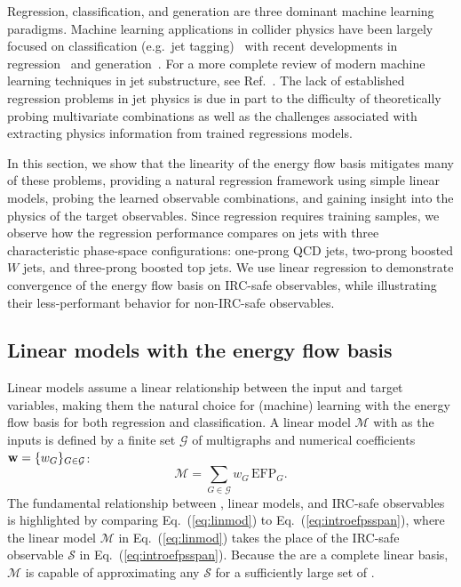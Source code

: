 \documentclass[letterpaper,11pt]{article}
\DeclareRobustCommand{\Eq}[1]{Eq.~(\ref{#1})}
\DeclareRobustCommand{\Ref}[1]{Ref.~\cite{#1}}
\newcommand{\B}{\text{EFP}\xspace}
\newcommand{\Bs}{\text{EFPs}\xspace}
\begin{document}
Regression, classification, and generation are three dominant machine learning paradigms. 
%
Machine learning applications in collider physics have been largely focused on classification (e.g.\ jet tagging)~\cite{Komiske:2016rsd,Almeida:2015jua,Baldi:2016fql,Kasieczka:2017nvn,Pearkes:2017hku,Butter:2017cot,Aguilar-Saavedra:2017rzt,Guest:2016iqz,Louppe:2017ipp} with recent developments in regression~\cite{Komiske:2017ubm} and generation~\cite{deOliveira:2017pjk, Paganini:2017hrr}. 
%
For a more complete review of modern machine learning techniques in jet substructure, see \Ref{Larkoski:2017jix}. 
%
The lack of established regression problems in jet physics is due in part to the difficulty of theoretically probing multivariate combinations as well as the challenges associated with extracting physics information from trained regressions models.

In this section, we show that the linearity of the energy flow basis mitigates many of these problems, providing a natural regression framework using simple linear models, probing the learned observable combinations, and gaining insight into the physics of the target observables. 
%
Since regression requires training samples, we observe how the regression performance compares on jets with three characteristic phase-space configurations: one-prong QCD jets, two-prong boosted $W$ jets, and three-prong boosted top jets. 
%
We use linear regression to demonstrate convergence of the energy flow basis on IRC-safe observables, while illustrating their less-performant behavior for non-IRC-safe observables.


\subsection{Linear models with the energy flow basis}
\label{sec:linmod}

Linear models assume a linear relationship between the input and target variables, making them the natural choice for (machine) learning with the energy flow basis for both regression and classification. 
%
A linear model $\mathscr M$ with \Bs as the inputs is defined by a finite set $\mathcal G$ of multigraphs and numerical coefficients ${\bf w}=\{w_G\}_{G\in\mathcal G}$:
\begin{equation}\label{eq:linmod}
\mathscr M = \sum_{G\in\mathcal G}w_G \,  \B_G.
\end{equation}
%
The fundamental relationship between \Bs, linear models, and IRC-safe observables is highlighted by comparing \Eq{eq:linmod} to \Eq{eq:introefpsspan}, where the linear model $\mathscr M$ in \Eq{eq:linmod} takes the place of the IRC-safe observable $\mathcal S$ in \Eq{eq:introefpsspan}. 
%
Because the \Bs are a complete linear basis, $\mathscr M$ is capable of approximating any $\mathcal S$ for a sufficiently large set of \Bs.
\end{document}
